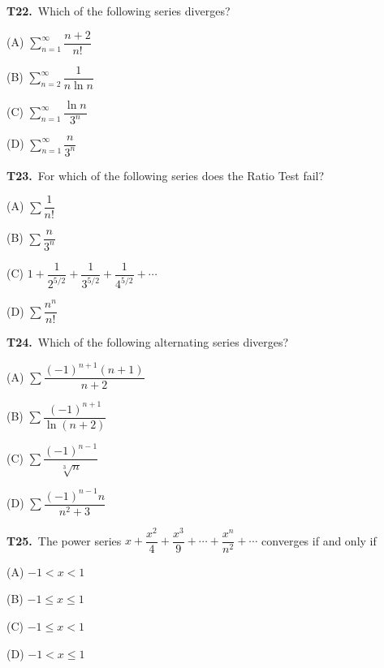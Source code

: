 \documentclass[11pt]{article}
\begin{document}
\bigskip\noindent\textbf{T22.}\ Which of the following series diverges?
\begin{list}{}{\setlength{\leftmargin}{3em}\setlength{\labelwidth}{2.5em}\setlength{\itemsep}{0pt}\setlength{\topsep}{2pt}}
\item[(A)] $\displaystyle\sum_{n=1}^\infty \dfrac{n+2}{n!}$
\item[(B)] $\displaystyle\sum_{n=2}^\infty \dfrac{1}{n\ln n}$
\item[(C)] $\displaystyle\sum_{n=1}^\infty \dfrac{\ln n}{3^n}$
\item[(D)] $\displaystyle\sum_{n=1}^\infty \dfrac{n}{3^n}$
\end{list}

\bigskip\noindent\textbf{T23.}\ For which of the following series does the Ratio Test fail?
\begin{list}{}{\setlength{\leftmargin}{3em}\setlength{\labelwidth}{2.5em}\setlength{\itemsep}{0pt}\setlength{\topsep}{2pt}}
\item[(A)] $\displaystyle\sum \dfrac{1}{n!}$
\item[(B)] $\displaystyle\sum \dfrac{n}{3^n}$
\item[(C)] $1+\dfrac{1}{2^{5/2}}+\dfrac{1}{3^{5/2}}+\dfrac{1}{4^{5/2}}+\cdots$
\item[(D)] $\displaystyle\sum \dfrac{n^n}{n!}$
\end{list}

\bigskip\noindent\textbf{T24.}\ Which of the following alternating series diverges?
\begin{list}{}{\setlength{\leftmargin}{3em}\setlength{\labelwidth}{2.5em}\setlength{\itemsep}{0pt}\setlength{\topsep}{2pt}}
\item[(A)] $\displaystyle\sum \dfrac{(-1)^{n+1}(n+1)}{n+2}$
\item[(B)] $\displaystyle\sum \dfrac{(-1)^{n+1}}{\ln(n+2)}$
\item[(C)] $\displaystyle\sum \dfrac{(-1)^{n-1}}{\sqrt[3]{n}}$
\item[(D)] $\displaystyle\sum \dfrac{(-1)^{n-1}n}{n^2+3}$
\end{list}

\bigskip\noindent\textbf{T25.}\ The power series $x+\dfrac{x^2}{4}+\dfrac{x^3}{9}+\cdots+\dfrac{x^n}{n^2}+\cdots$ converges if and only if
\begin{list}{}{\setlength{\leftmargin}{3em}\setlength{\labelwidth}{2.5em}\setlength{\itemsep}{0pt}\setlength{\topsep}{2pt}}
\item[(A)] $-1<x<1$
\item[(B)] $-1\leq x\leq 1$
\item[(C)] $-1\leq x<1$
\item[(D)] $-1<x\leq 1$
\end{list}
\end{document}
